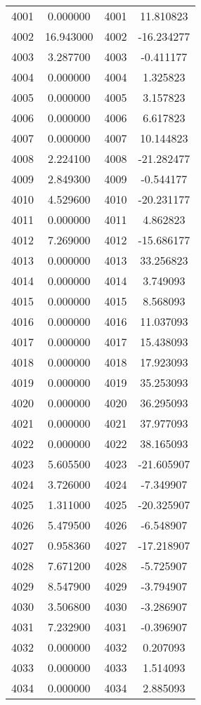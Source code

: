 \documentclass[12pt]{article}
\begin{document}
\begin{longtable}{@{}cccc@{}}
4001 & 0.000000 & 4001 & 11.810823 \\
4002 & 16.943000 & 4002 & -16.234277 \\
4003 & 3.287700 & 4003 & -0.411177 \\
4004 & 0.000000 & 4004 & 1.325823 \\
4005 & 0.000000 & 4005 & 3.157823 \\
4006 & 0.000000 & 4006 & 6.617823 \\
4007 & 0.000000 & 4007 & 10.144823 \\
4008 & 2.224100 & 4008 & -21.282477 \\
4009 & 2.849300 & 4009 & -0.544177 \\
4010 & 4.529600 & 4010 & -20.231177 \\
4011 & 0.000000 & 4011 & 4.862823 \\
4012 & 7.269000 & 4012 & -15.686177 \\
4013 & 0.000000 & 4013 & 33.256823 \\
4014 & 0.000000 & 4014 & 3.749093 \\
4015 & 0.000000 & 4015 & 8.568093 \\
4016 & 0.000000 & 4016 & 11.037093 \\
4017 & 0.000000 & 4017 & 15.438093 \\
4018 & 0.000000 & 4018 & 17.923093 \\
4019 & 0.000000 & 4019 & 35.253093 \\
4020 & 0.000000 & 4020 & 36.295093 \\
4021 & 0.000000 & 4021 & 37.977093 \\
4022 & 0.000000 & 4022 & 38.165093 \\
4023 & 5.605500 & 4023 & -21.605907 \\
4024 & 3.726000 & 4024 & -7.349907 \\
4025 & 1.311000 & 4025 & -20.325907 \\
4026 & 5.479500 & 4026 & -6.548907 \\
4027 & 0.958360 & 4027 & -17.218907 \\
4028 & 7.671200 & 4028 & -5.725907 \\
4029 & 8.547900 & 4029 & -3.794907 \\
4030 & 3.506800 & 4030 & -3.286907 \\
4031 & 7.232900 & 4031 & -0.396907 \\
4032 & 0.000000 & 4032 & 0.207093 \\
4033 & 0.000000 & 4033 & 1.514093 \\
4034 & 0.000000 & 4034 & 2.885093 \\

\end{longtable}
\end{document}
